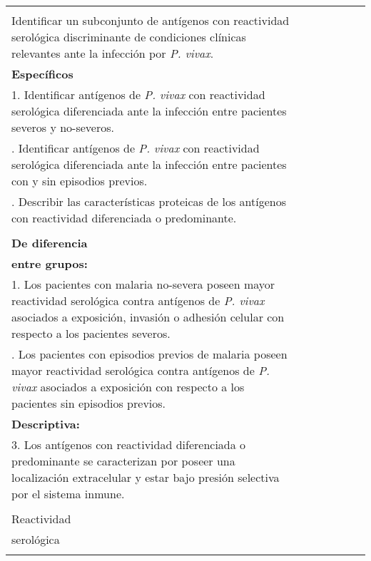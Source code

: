 \documentclass[
  a4paper]{article}
\begin{document}
{\begin{landscape}
\begin{center}
\begin{tabular}{|m{3.2cm}m{3.2cm}m{3.2cm}m{3.2cm}m{3.2cm}m{3.2cm}m{3.2cm}|}
\begin{minipage}{3.2cm}
  \end{minipage} 
  & 
  \begin{minipage}{3.2cm} 
  \textbf{General}\\
  Identificar un subconjunto de antígenos con reactividad serológica 
  discriminante de condiciones clínicas relevantes ante la infección por \textit{P. vivax}.\\
  \newline
  \textbf{Específicos}\\
  1. Identificar antígenos de \textit{P. vivax} con reactividad serológica 
  diferenciada ante la infección entre pacientes 
  severos y no-severos.\\
  \newline
  2. Identificar antígenos de \textit{P. vivax} con reactividad serológica 
  diferenciada ante la infección entre pacientes 
  con y sin episodios previos.\\
  \newline
  3. Describir las características proteicas de los antígenos con reactividad 
  diferenciada o predominante.\\
  \end{minipage} 
  & 
  \begin{minipage}{3.2cm} 
  .\\
  \textbf{De diferencia}\\ \textbf{entre grupos:}\\
  1. Los pacientes con malaria no-severa poseen 
  mayor reactividad serológica contra antígenos de \textit{P. vivax}
  asociados a exposición, invasión o adhesión celular
  con respecto a los pacientes severos.\\
  \newline
  2. Los pacientes con episodios previos de malaria poseen
  mayor reactividad serológica contra antígenos de \textit{P. vivax}
  asociados a exposición
  con respecto a los pacientes sin episodios previos.\\
  \newline
  \textbf{Descriptiva:}\\
  3. Los antígenos con reactividad diferenciada o predominante
  se caracterizan por poseer una localización extracelular 
  y estar bajo presión selectiva por el sistema inmune.\\
  \end{minipage} 
  &
  \begin{minipage}{3.2cm} 
  \textbf{Dependiente}\\ Reactividad\\ serológica\\

\end{minipage}
\end{tabular}
\end{center}
\end{landscape}}
\end{document}
